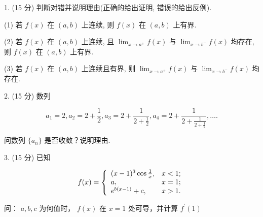 \documentclass{examcollection}
\renewcommand{\displayformula}[1]{\[#1\]}
\begin{document}
{\begin{minipage}{\textwidth}
1. (15 分) 判断对错并说明理由(正确的给出证明, 错误的给出反例).\par
(1) 若 $f(x)$ 在 $(a, b)$ 上连续, 则 $f(x)$ 在 $(a, b)$ 上有界.\par
(2) 若 $f(x)$ 在 $(a, b)$ 上连续, 且 $\lim_{x \to a^{+}} f(x)$ 与 $\lim_{x \to b^{-}} f(x)$ 均存在, 则 $f(x)$ 在 $(a, b)$ 上有界.\par
(3) 若 $f(x)$ 在 $(a, b)$ 上连续且有界, 则 $\lim_{x \to a^{+}} f(x)$ 与 $\lim_{x \to b^{-}} f(x)$ 均存在.\par
2. (15 分) 数列\par
\displayformula{a _ {1} = 2, a _ {2} = 2 + \frac {1}{2}, a _ {3} = 2 + \frac {1}{2 + \frac {1}{2}}, a _ {4} = 2 + \frac {1}{2 + \frac {1}{2 + \frac {1}{2}}}, \dots .}\par
问数列 $\{a_{n}\}$ 是否收敛？说明理由.\par
3. (15 分) 已知\par
\displayformula{f (x) = \left\{ \begin{array}{l l} (x - 1) ^ {3} \cos \frac {1}{x}, & x <   1; \\ a, & x = 1; \\ e ^ {b (x - 1)} + c, & x > 1. \end{array} \right.}\par
问： $a,b,c$ 为何值时， $f(x)$ 在 $x = 1$ 处可导，并计算 $f^{\prime}(1)$\par
\end{minipage}}
\ifdim\dimexpr\ht\proofbox+\dp\proofbox\relax>\textheight
\noindent\resizebox{!}{\textheight}{\usebox{\proofbox}}\else\noindent\usebox{\proofbox}\fi\clearpage
\end{document}
